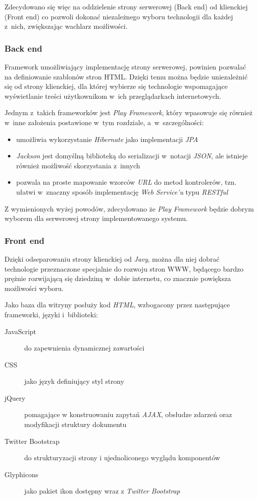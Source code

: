 \documentclass[11pt]{aghdpl}
\begin{document}
Zdecydowano się więc na oddzielenie strony serwerowej (Back end) od klienckiej (Front end) co pozwoli dokonać niezależnego wyboru technologii dla każdej z~nich, zwiększając wachlarz możliwości.

\subsubsection{Back end}

Framework umożliwiający implementację strony serwerowej, powinien pozwalać na definiowanie szablonów stron HTML. Dzięki temu można będzie uniezależnić się od strony klienckiej, dla której wybierze się technologie wspomagające wyświetlanie treści użytkownikom w~ich przeglądarkach internetowych.

Jednym z~takich frameworków jest \emph{Play Framework}, który wpasowuje się również w~inne założenia postawione w~tym rozdziale, a~w~szczególności:

\begin{itemize}
	\item umożliwia wykorzystanie \emph{Hibernate} jako implementacji \emph{JPA}
	\item \emph{Jackson} jest domyślną biblioteką do serializacji w~notacji \emph{JSON}, ale istnieje również możliwość skorzystania z~innych
	\item pozwala na proste mapowanie wzorców \emph{URL} do metod kontrolerów, tzn. ułatwi w~znaczny sposób implementację \emph{Web Service'u} typu \emph{RESTful}
\end{itemize}

Z wymienionych wyżej powodów, zdecydowano że \emph{Play Framework} będzie dobrym wyborem dla serwerowej strony implementowanego systemu.

\subsubsection{Front end}
Dzięki odseparowaniu strony klienckiej od \emph{Javy}, można dla niej dobrać technologie przeznaczone specjalnie do rozwoju stron WWW, będącego bardzo prężnie rozwijającą się dziedziną w~dobie internetu, co znacznie powiększa możliwości wyboru.

Jako baza dla witryny posłuży kod \emph{HTML}, wzbogacony przez następujące frameworki, języki i~biblioteki:

\begin{description}
\item[JavaScript] do zapewnienia dynamicznej zawartości
\item[CSS] jako język definiujący styl strony
\item[jQuery] pomagające w konstruowaniu zapytań \emph{AJAX}, obsłudze zdarzeń oraz modyfikacji struktury dokumentu
\item[Twitter Bootstrap] do strukturyzacji strony i ujednoliconego wyglądu komponentów
\item[Glyphicons] jako pakiet ikon dostępny wraz z \emph{Twitter Bootstrap}
\end{description}
\end{document}

